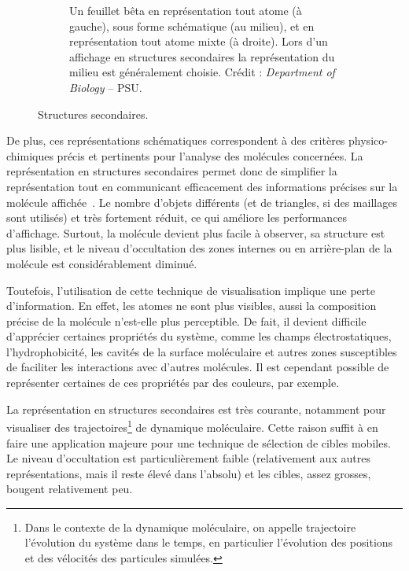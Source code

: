 \begin{figure}[htb]
\begin{subfigure}[b]{.5\textwidth}
			\caption[Feuillets bêta]{Un feuillet bêta en représentation \og tout atome \fg{} (à gauche), sous forme schématique (au milieu), et en représentation \og tout atome \fg{} mixte (à droite). Lors d'un affichage \og en structures secondaires \fg{} la représentation du milieu est généralement choisie. Crédit : \emph{Department of Biology} -- PSU\footnotemark.}
			\label{fig:bSheet}
		\end{subfigure}
		\caption{Structures secondaires.}
		\label{fig:secStructs}
	\end{figure}
	
	\addtocounter{footnote}{-1}
	\addtocounter{footnote}{1}
		
	De plus, ces représentations schématiques correspondent à des critères physico-chimiques précis et pertinents pour l'analyse des molécules concernées. La représentation en structures secondaires permet donc de simplifier la représentation tout en communicant efficacement des informations précises sur la molécule affichée~\cite{richardson2002teaching}. Le nombre d'objets différents (et de triangles, si des maillages sont utilisés) et très fortement réduit, ce qui améliore les performances d'affichage. Surtout, la molécule devient plus facile à observer, sa structure est plus lisible, et le niveau d'occultation des zones internes ou en arrière-plan de la molécule est considérablement diminué.
		
	Toutefois, l'utilisation de cette technique de visualisation implique une perte d'information. En effet, les atomes ne sont plus visibles, aussi la composition précise de la molécule n'est-elle plus perceptible. De fait, il devient difficile d'apprécier certaines propriétés du système, comme les champs électrostatiques, l'hydrophobicité, les cavités de la surface moléculaire et autres zones susceptibles de faciliter les interactions avec d'autres molécules. Il est cependant possible de représenter certaines de ces propriétés par des couleurs, par exemple.
		
	La représentation en structures secondaires est très courante, notamment pour visualiser des trajectoires\footnote{Dans le contexte de la dynamique moléculaire, on appelle \og trajectoire \fg{} l'évolution du système dans le temps, en particulier l'évolution des positions et des vélocités des particules simulées.} de dynamique moléculaire. Cette raison suffit à en faire une application majeure pour une technique de sélection de cibles mobiles. Le niveau d'occultation est particulièrement faible (relativement aux autres représentations, mais il reste élevé dans l'absolu) et les cibles, assez grosses, bougent relativement peu.
		
